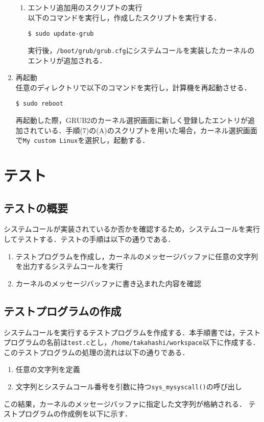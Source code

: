 \documentclass[12pt]{jsarticle}
\begin{document}
\begin{enumerate}
\begin{enumerate}
\item エントリ追加用のスクリプトの実行\\
  以下のコマンドを実行し，作成したスクリプトを実行する．
\begin{verbatim}
$ sudo update-grub
\end{verbatim}
実行後，\verb|/boot/grub/grub.cfg|にシステムコールを実装したカーネルのエントリが追加される．
  \end{enumerate}
  
\item 再起動 \\
  任意のディレクトリで以下のコマンドを実行し，計算機を再起動させる．
\begin{verbatim}
$ sudo reboot
\end{verbatim}
再起動した際，GRUB2のカーネル選択画面に新しく登録したエントリが追加されている．手順(7)の(A)のスクリプトを用いた場合，カーネル選択画面で\verb|My custom Linux|を選択し，起動する．

\end{enumerate}

\newpage
\section{テスト}
\label{sec:test}
\subsection{テストの概要}
システムコールが実装されているか否かを確認するため，システムコールを実行してテストする．テストの手順は以下の通りである．

\begin{enumerate}
\item テストプログラムを作成し，カーネルのメッセージバッファに任意の文字列を出力するシステムコールを実行
\item カーネルのメッセージバッファに書き込まれた内容を確認
\end{enumerate}

\subsection{テストプログラムの作成}
システムコールを実行するテストプログラムを作成する．本手順書では，テストプログラムの名前は\verb|test.c|とし，\verb|/home/takahashi/workspace|以下に作成する．このテストプログラムの処理の流れは以下の通りである．

\begin{enumerate}
\item 任意の文字列を定義
\item 文字列とシステムコール番号を引数に持つ\verb|sys_mysyscall()|の呼び出し
\end{enumerate}
この結果，カーネルのメッセージバッファに指定した文字列が格納される．
テストプログラムの作成例を以下に示す．
\end{document}
